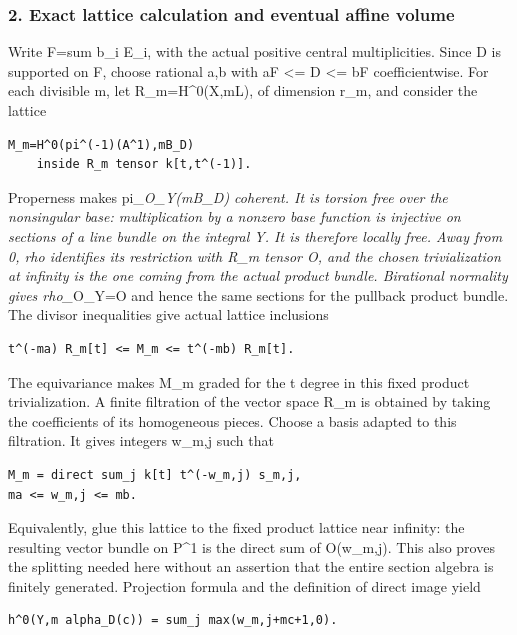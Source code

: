 \documentclass[
  10pt,
]{article}
\begin{document}
\subsubsection{2. Exact lattice calculation and eventual affine
volume}\label{exact-lattice-calculation-and-eventual-affine-volume}

Write F=sum b\_i E\_i, with the actual positive central multiplicities.
Since D is supported on F, choose rational a,b with aF \textless= D
\textless= bF coefficientwise. For each divisible m, let
R\_m=H\^{}0(X,mL), of dimension r\_m, and consider the lattice

\begin{verbatim}
M_m=H^0(pi^(-1)(A^1),mB_D)
    inside R_m tensor k[t,t^(-1)].
\end{verbatim}

Properness makes pi\_\emph{O\_Y(mB\_D) coherent. It is torsion free over
the nonsingular base: multiplication by a nonzero base function is
injective on sections of a line bundle on the integral Y. It is
therefore locally free. Away from 0, rho identifies its restriction with
R\_m tensor O, and the chosen trivialization at infinity is the one
coming from the actual product bundle. Birational normality gives
rho\_}O\_Y=O and hence the same sections for the pullback product
bundle. The divisor inequalities give actual lattice inclusions

\begin{verbatim}
t^(-ma) R_m[t] <= M_m <= t^(-mb) R_m[t].
\end{verbatim}

The equivariance makes M\_m graded for the t degree in this fixed
product trivialization. A finite filtration of the vector space R\_m is
obtained by taking the coefficients of its homogeneous pieces. Choose a
basis adapted to this filtration. It gives integers w\_m,j such that

\begin{verbatim}
M_m = direct sum_j k[t] t^(-w_m,j) s_m,j,
ma <= w_m,j <= mb.
\end{verbatim}

Equivalently, glue this lattice to the fixed product lattice near
infinity: the resulting vector bundle on P\^{}1 is the direct sum of
O(w\_m,j). This also proves the splitting needed here without an
assertion that the entire section algebra is finitely generated.
Projection formula and the definition of direct image yield

\begin{verbatim}
h^0(Y,m alpha_D(c)) = sum_j max(w_m,j+mc+1,0).
\end{verbatim}
\end{document}
